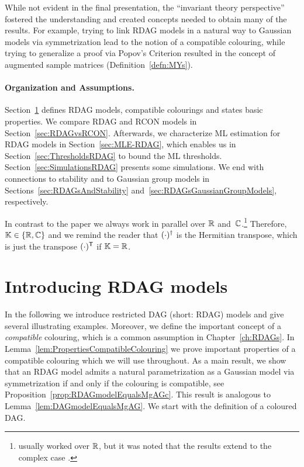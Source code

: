 While not evident in the final presentation, the ``invariant theory perspective'' fostered the understanding and created concepts needed to obtain many of the results. For example, trying to link RDAG models in a natural way to Gaussian models via symmetrization lead to the notion of a compatible colouring, while trying to generalize a proof via Popov's Criterion resulted in the concept of augmented sample matrices (Definition~\ref{defn:MYs}).



\paragraph{Organization and Assumptions.}
Section~\ref{sec:IntroRDAG} defines RDAG models, compatible colourings and states basic properties. We compare RDAG and RCON models in Section~\ref{sec:RDAGvsRCON}. Afterwards, we characterize ML estimation for RDAG models in Section~\ref{sec:MLE-RDAG}, which enables us in Section~\ref{sec:ThresholdsRDAG} to bound the ML thresholds. Section~\ref{sec:SimulationsRDAG} presents some simulations. We end with connections to stability and to Gaussian group models in Sections~\ref{sec:RDAGsAndStability} and~\ref{sec:RDAGsGaussianGroupModels}, respectively.

In contrast to the paper \cite{RDAG} we always work in parallel over $\mathbb R$ and~$\mathbb C$.\footnote{\cite{RDAG} usually worked over $\mathbb R$, but it was noted that the results extend to the complex case \cite[Remark~2.11]{RDAG}.}
Therefore, $\mathbb K \in \{ \mathbb R, \mathbb C\}$ and we remind the reader that $(\cdot)^{\dagger}$ is the Hermitian transpose, which is just the transpose $(\cdot)^{\mathsf{T}}$ if $\mathbb K = \mathbb R$.





\section{Introducing RDAG models} \label{sec:IntroRDAG}

In the following we introduce restricted DAG (short: RDAG) models and give several illustrating examples. Moreover, we define the important concept of a \emph{compatible} colouring, which is a common assumption in Chapter~\ref{ch:RDAGs}. In Lemma~\ref{lem:PropertiesCompatibleColouring} we prove important properties of a compatible colouring which we will use throughout. As a main result, we show that an RDAG model admits a natural parametrization as a Gaussian model via symmetrization if and only if the colouring is compatible, see Proposition~\ref{prop:RDAGmodelEqualsMgAGc}. This result is analogous to Lemma~\ref{lem:DAGmodelEqualsMgAG}.
We start with the definition of a coloured DAG.

